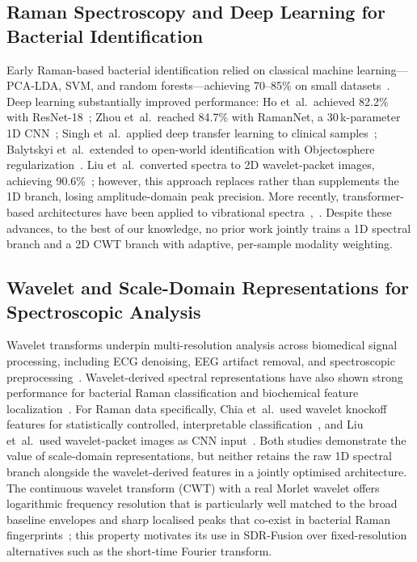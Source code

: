 \documentclass[preprint,12pt]{elsarticle}
\begin{document}
\subsection{Raman Spectroscopy and Deep Learning for Bacterial
Identification}
\label{ssec:raman_dl}

Early Raman-based bacterial identification relied on classical machine
learning---PCA-LDA, SVM, and random forests---achieving 70--85\% on
small datasets~\cite{ho2019rapid,zhou2022ramannet}. Deep learning
substantially improved performance: Ho et~al.\ achieved 82.2\% with
ResNet-18~\cite{ho2019rapid}; Zhou et~al.\ reached 84.7\% with
RamanNet, a 30\,k-parameter 1D CNN~\cite{zhou2022ramannet}; Singh
et~al.\ applied deep transfer learning to clinical
samples~\cite{singh2022culture}; Balytskyi et~al.\
extended to open-world identification with Objectosphere
regularization~\cite{balytskyi2024open}. Liu et~al.\ converted spectra
to 2D wavelet-packet images, achieving 90.6\%~\cite{liu2024wpga};
however, this approach replaces rather than supplements the 1D branch,
losing amplitude-domain peak precision. More recently, transformer-based
architectures have been applied to vibrational spectra~\cite{yan2023spectral},~\cite{lussier2020deep}. Despite these advances, to the best of our knowledge, no prior
work jointly trains a 1D spectral branch and a 2D CWT branch with
adaptive, per-sample modality weighting.

\subsection{Wavelet and Scale-Domain Representations for Spectroscopic
Analysis}
\label{ssec:wavelet}

Wavelet transforms underpin multi-resolution analysis across biomedical
signal processing, including ECG denoising, EEG artifact
removal, and spectroscopic
preprocessing~\cite{lussier2020deep,maruthamuthu2020rapid}. Wavelet-derived spectral representations have also shown strong
performance for bacterial Raman classification and biochemical feature
localization~\cite{liu2024wpga}. For Raman
data specifically, Chia et~al.\ used wavelet knockoff features for
statistically controlled, interpretable
classification~\cite{chia2021interpretable}, and Liu et~al.\ used
wavelet-packet images as CNN input~\cite{liu2024wpga}. Both studies
demonstrate the value of scale-domain representations, but neither
retains the raw 1D spectral branch alongside the wavelet-derived
features in a jointly optimised architecture. The continuous wavelet
transform (CWT) with a real Morlet wavelet offers logarithmic
frequency resolution that is particularly well matched to the broad
baseline envelopes and sharp localised peaks that co-exist in bacterial
Raman fingerprints~\cite{chia2021interpretable,liu2024wpga}; this
property motivates its use in SDR-Fusion over fixed-resolution
alternatives such as the short-time Fourier transform.
\end{document}
